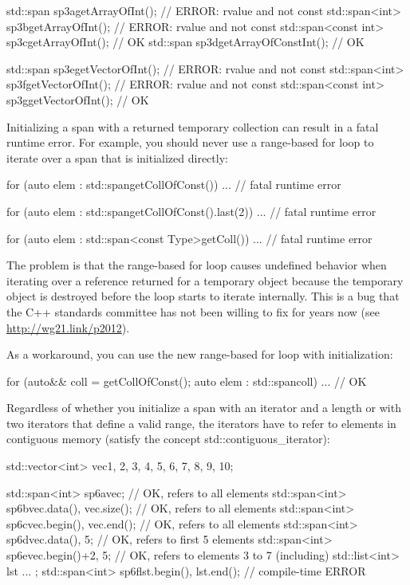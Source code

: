 \begin{cpp}
std::span sp3a{getArrayOfInt()}; // ERROR: rvalue and not const
std::span<int> sp3b{getArrayOfInt()}; // ERROR: rvalue and not const
std::span<const int> sp3c{getArrayOfInt()}; // OK
std::span sp3d{getArrayOfConstInt()}; // OK

std::span sp3e{getVectorOfInt()}; // ERROR: rvalue and not const
std::span<int> sp3f{getVectorOfInt()}; // ERROR: rvalue and not const
std::span<const int> sp3g{getVectorOfInt()}; // OK
\end{cpp}

Initializing a span with a returned temporary collection can result in a fatal runtime error. For example, you should never use a range-based for loop to iterate over a span that is initialized directly:

\begin{cpp}
for (auto elem : std::span{getCollOfConst()}) ... // fatal runtime error

for (auto elem : std::span{getCollOfConst()}.last(2)) ... // fatal runtime error

for (auto elem : std::span<const Type>{getColl()}) ... // fatal runtime error
\end{cpp}

The problem is that the range-based for loop causes undefined behavior when iterating over a reference returned for a temporary object because the temporary object is destroyed before the loop starts to iterate internally. This is a bug that the C++ standards committee has not been willing to fix for years now (see \url{http://wg21.link/p2012}).

As a workaround, you can use the new range-based for loop with initialization:

\begin{cpp}
for (auto&& coll = getCollOfConst(); auto elem : std::span{coll}) ... // OK
\end{cpp}

Regardless of whether you initialize a span with an iterator and a length or with two iterators that define a valid range, the iterators have to refer to elements in contiguous memory (satisfy the concept std::contiguous\_iterator):

\begin{cpp}
std::vector<int> vec{1, 2, 3, 4, 5, 6, 7, 8, 9, 10};

std::span<int> sp6a{vec}; // OK, refers to all elements
std::span<int> sp6b{vec.data(), vec.size()}; // OK, refers to all elements
std::span<int> sp6c{vec.begin(), vec.end()}; // OK, refers to all elements
std::span<int> sp6d{vec.data(), 5}; // OK, refers to first 5 elements
std::span<int> sp6e{vec.begin()+2, 5}; // OK, refers to elements 3 to 7 (including)
std::list<int> lst{ ... };
std::span<int> sp6f{lst.begin(), lst.end()}; // compile-time ERROR
\end{cpp}

